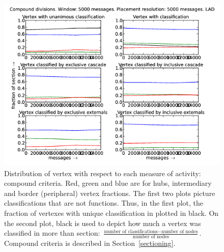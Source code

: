 \documentclass[%
 aip,
 jmp,%
 amsmath,amssymb,
 reprint,%
]{revtex4-1}
\begin{document}
\begin{figure}[hbtp] 
   \centering
        \includegraphics[width=\textwidth]{figs/LAD/5000_2}
    \caption{Distribution of vertex with respect to each measure of activity: compound criteria. Red, green and blue are for hubs, intermediary and border (peripheral) vertex fractions. The first two plots picture classifications that are not functions. Thus, in the first plot, the fraction of vertexes with unique classification in plotted in black. On the second plot, black is used to depict how much a vertex was classified in more than section: $\frac{\text{number of classifications} - \text{number of nodes}}{\text{number of nodes}}$. Compound criteria is described in Section~\ref{sectioning}.}
    \label{fig:lad5000_}
\end{figure}
\end{document}
